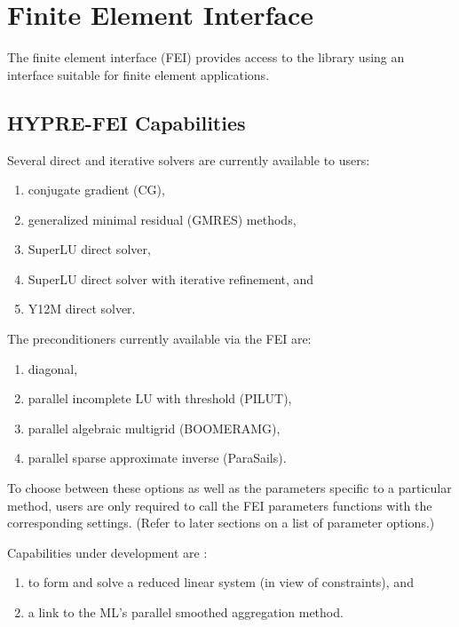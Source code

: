 \chapter{Finite Element Interface}
\label{chapter-FEI}

The finite element interface (FEI) provides access to the \hypre{}
library using an interface suitable for finite element applications.

\section{HYPRE-FEI Capabilities}

Several direct and iterative solvers are
currently available to users:

\begin{enumerate}
\item conjugate gradient (CG), 
\item generalized minimal residual (GMRES) methods,
\item SuperLU direct solver,
\item SuperLU direct solver with iterative refinement, and
\item Y12M direct solver.
\end{enumerate}

The \hypre{} preconditioners currently available via the FEI are:

\begin{enumerate}
\item diagonal, 
\item parallel incomplete LU with threshold (PILUT),
\item parallel algebraic multigrid (BOOMERAMG),
\item parallel sparse approximate inverse (ParaSails).
\end{enumerate}

To choose between these options as well as the parameters specific to a
particular method, users are only required to call the FEI {\sf parameters}
functions with the corresponding settings.  (Refer to later sections on   
a list of parameter options.)

Capabilities under development are :
\begin{enumerate}
\item to form and solve a reduced linear system (in view of constraints), and
\item a link to the ML's parallel smoothed aggregation method.
\end{enumerate}


